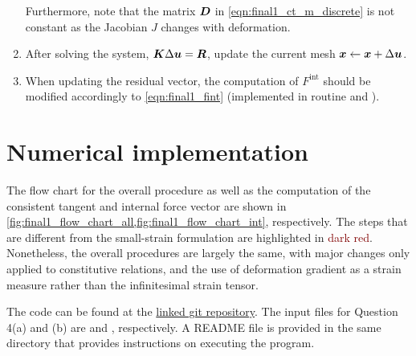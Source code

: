 \begin{enumerate}[1.]
{    Furthermore, note that the matrix $\bm{D}$ in \cref{eqn:final1_ct_m_discrete} is not constant as the Jacobian $J$ changes with deformation.
}
\item {
    After solving the system, $\bm{K} \Delta \bm{u} = \bm{R}$, update the current mesh $\bm{x} \gets \bm{x} + \Delta \bm{u}$.
}
\item {
    When updating the residual vector, the computation of $F^{\textrm{int}}$ should be modified accordingly to \cref{eqn:final1_fint} (implemented in routine \href{https://github.com/sy-cui/CSE552-FA2024/blob/main/final/part1/elasticity/hyperelasticity/fint_2d.m}{} and \href{https://github.com/sy-cui/CSE552-FA2024/blob/main/final/part1/elasticity/hyperelasticity/fint_elem_2d.m}{}).
}
\end{enumerate}

\section{Numerical implementation}
The flow chart for the overall procedure as well as the computation of the consistent tangent and internal force vector are shown in \cref{fig:final1_flow_chart_all,fig:final1_flow_chart_int}, respectively.
The steps that are different from the small-strain formulation are highlighted in \textcolor{Maroon}{dark red}.
Nonetheless, the overall procedures are largely the same, with major changes only applied to constitutive relations, and the use of deformation gradient as a strain measure rather than the infinitesimal strain tensor. 

The code can be found at the \href{https://github.com/sy-cui/CSE552-FA2024/tree/main/final/part1}{linked git repository}. 
The input files for Question 4(a) and (b) are \href{https://github.com/sy-cui/CSE552-FA2024/blob/main/final/part1/input/input_nh_stretch.m}{} and \href{https://github.com/sy-cui/CSE552-FA2024/blob/main/final/part1/input/input_nh_shear.m}{}, respectively.
A README file is provided in the same directory that provides instructions on executing the program. 

